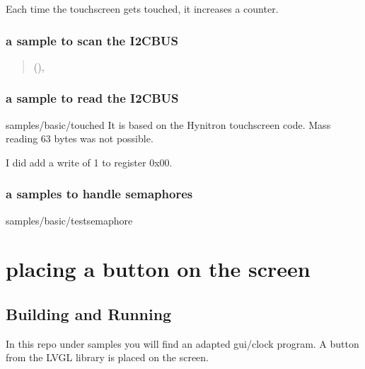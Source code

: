 \documentclass[letterpaper,10pt,english]{sphinxmanual}
\begin{document}
Each time the touchscreen gets touched, it increases a counter.


\subsubsection{a sample to scan the I2C\sphinxhyphen{}BUS}
\label{\detokenize{behind/troubleshoot:a-sample-to-scan-the-i2c-bus}}\begin{quote}

({\hyperref[\detokenize{hacking/i2cscanning:i2cscanning}]{}}),
\end{quote}


\subsubsection{a sample to read the I2C\sphinxhyphen{}BUS}
\label{\detokenize{behind/troubleshoot:a-sample-to-read-the-i2c-bus}}
samples/basic/touched
It is based on the Hynitron touchscreen code.
Mass reading 63 bytes was not possible.

I did add a write of 1 to register 0x00.


\subsubsection{a samples to handle semaphores}
\label{\detokenize{behind/troubleshoot:a-samples-to-handle-semaphores}}
samples/basic/testsemaphore


\section{placing a button on the screen}
\label{\detokenize{behind/lvglbutton:placing-a-button-on-the-screen}}\label{\detokenize{behind/lvglbutton::doc}}
\begin{sphinxVerbatim}[commandchars=\\\{\}]
                             
\end{sphinxVerbatim}


\subsection{Building and Running}
\label{\detokenize{behind/lvglbutton:building-and-running}}
In this repo under samples you will find an adapted gui/clock program.
A button from the LVGL library is placed on the screen.
\end{document}
